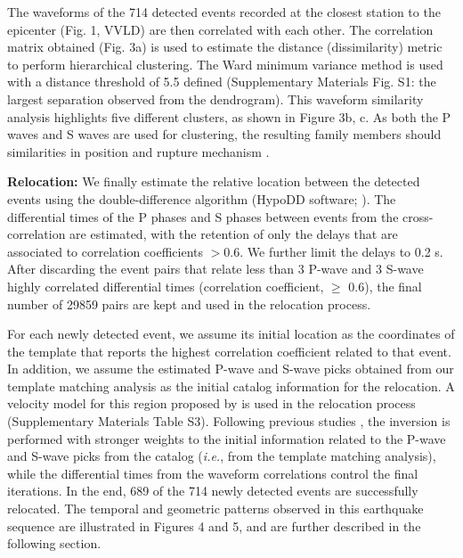 \documentclass[a4paper,12pt,twoside]{article}
\begin{document}
The waveforms of the 714 detected events recorded at the closest station to the epicenter (Fig. 1, VVLD) are then correlated with each other. The correlation matrix obtained (Fig. 3a) is used to estimate the distance (dissimilarity) metric to perform hierarchical clustering. The Ward minimum variance method is used \citep{Ward_1963_HGO} with  a distance threshold of 5.5 defined (Supplementary Materials Fig. S1: the largest separation observed from the dendrogram). This waveform similarity analysis highlights five different clusters, as shown in Figure 3b, c.  As both the P waves and S waves are used for clustering, the resulting family members should \protect{} \protect{} similarities in position and rupture mechanism \citep{Kagan_1991_LTE, wehling_2013_IDT, Cesca_2014_SMC, Ellsworth_2018_NIE, Cattaneo_1999_WSA}. \protect{}

{\bf Relocation:} We finally estimate the relative location between the detected events using the double-difference algorithm (HypoDD software; \cite{Waldhauser_2001_HDD}). The differential times of the P phases and S phases between events from the cross-correlation are estimated, with the retention of only the delays that are associated to correlation coefficients $>$0.6. We further limit the delays to 0.2 s. After discarding the event pairs that relate less than 3 P-wave and 3 S-wave highly correlated differential times (correlation coefficient, $\geq$ 0.6), the final number of 29859 pairs are kept and used in the relocation process. 

For each newly detected event, we assume its initial location as the coordinates of the template that reports the highest correlation coefficient related to that event. In addition, we assume the estimated P-wave and S-wave picks obtained from our template matching analysis as the initial catalog information for the relocation. A velocity model for this region proposed by \cite{Bagh_2007_BSC} is used in the relocation process (Supplementary Materials Table S3). Following previous studies \citep{Shelly_2019_IFC}, the inversion is performed with stronger weights to the initial information related to the P-wave and S-wave picks from the catalog (\emph{i.e.}, from the template matching analysis), while the differential times from the waveform correlations control the final iterations. In the end, 689 of the 714 newly detected events are successfully relocated. The temporal and geometric patterns observed in this earthquake sequence are illustrated in Figures 4 and 5, and are further described in the following section.
\end{document}

